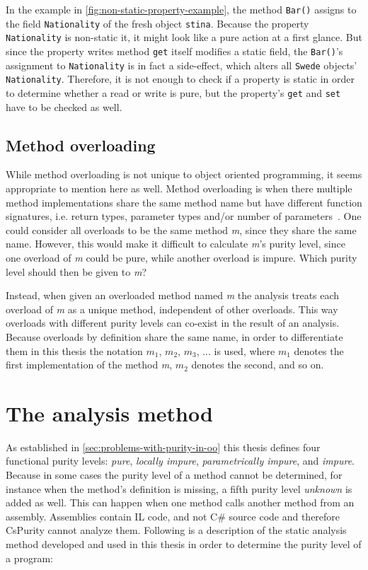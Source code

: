 \documentclass[a4paper,12pt]{article}
\begin{document}
In the example in \autoref{fig:non-static-property-example}, the method \texttt{Bar()} assigns to the field \texttt{Nationality} of the fresh object \texttt{stina}. Because the property \texttt{Nationality} is non-static it, it might look like a pure action at a first glance. But since the property writes method \texttt{get} itself modifies a static field, the \texttt{Bar()}'s assignment to \texttt{Nationality} is in fact a side-effect, which alters all \texttt{Swede} objects' \texttt{Nationality}. Therefore, it is not enough to check if a property is static in order to determine whether a read or write is pure, but the property's \texttt{get} and \texttt{set} have to be checked as well.


\subsection{Method overloading} \label{sub:Method-overloading}

While method overloading is not unique to object oriented programming, it seems appropriate to mention here as well. Method overloading is when there multiple method implementations share the same method name but have different function signatures, i.e. return types, parameter types and/or number of parameters~\cite{albahari2003nutshell}. One could consider all overloads to be the same method \textit{m}, since they share the same name. However, this would make it difficult to calculate \textit{m}'s purity level, since one overload of \textit{m} could be pure, while another overload is impure. Which purity level should then be given to \textit{m}?

Instead, when given an overloaded method named \textit{m} the analysis treats each overload of \textit{m} as a unique method, independent of other overloads. This way overloads with different purity levels can co-exist in the result of an analysis. Because overloads by definition share the same name, in order to differentiate them in this thesis the notation $m_1$, $m_2$, $m_3$, ... is used, where $m_1$ denotes the first implementation of the method \textit{m}, $m_2$ denotes the second, and so on.

\section{The analysis method} \label{sec:the-analysis-method}

As established in \autoref{sec:problems-with-purity-in-oo} this thesis defines four functional purity levels: \textit{pure}, \textit{locally impure}, \textit{parametrically impure}, and \textit{impure}. Because in some cases the purity level of a method cannot be determined, for instance when the method's definition is missing, a fifth purity level \textit{unknown} is added as well. This can happen when one method calls another method from an assembly. Assemblies contain IL code, and not C\# source code and therefore CsPurity cannot analyze them. Following is a description of the static analysis method developed and used in this thesis in order to determine the purity level of a program:
\end{document}
